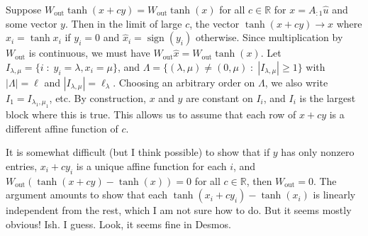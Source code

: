 \documentclass{article}
\newcommand{\Wout}{W_{\text{out}}}
\begin{document}
Suppose $\Wout \tanh(x+cy) =  \Wout \tanh(x)$ for all $c\in\mathbb{R}$ for $x=A_{:1}\hat u$ and some vector $y$. Then in the limit of large $c$, the vector $\tanh(x+cy)\rightarrow \hat x$ where $\hat x_i = \tanh x_i$ if $y_i = 0$ and $\hat x_i = \operatorname{sign}(y_i)$ otherwise. Since multiplication by $\Wout$ is continuous, we must have $\Wout \hat x = \Wout \tanh (x)$. Let $I_{\lambda, \mu} = \{i\;:\;y_i = \lambda, x_i = \mu\}$, and $\Lambda = \{(\lambda, \mu)\neq (0, \mu)\;:\;|I_{\lambda, \mu}|\geq 1\}$ with $|\Lambda| = \ell$ and $|I_{\lambda, \mu}| = \ell_\lambda$. Choosing an arbitrary order on $\Lambda$, we also write $I_1 = I_{\lambda_1, \mu_1}$, etc. By construction, $x$ and $y$ are constant on $I_i$, and $I_i$ is the largest block where this is true. This allows us to assume that each row of $x+cy$ is a different affine function of $c$. 

It is somewhat difficult (but I think possible) to show that if $y$ has only nonzero entries, $x_i+cy_i$ is a unique affine function for each $i$, and $\Wout (\tanh(x+cy) - \tanh(x)) = 0$ for all $c\in\mathbb{R}$, then $\Wout = 0$. The argument amounts to show that each $\tanh(x_i+cy_i) - \tanh(x_i)$ is linearly independent from the rest, which I am not sure how to do. But it seems mostly obvious! Ish. I guess. Look, it seems fine in Desmos.
\end{document}
